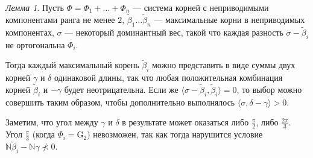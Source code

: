 \documentclass[10pt]{article}
\theoremstyle{break}
\theoremstyle{remark}
\newtheorem{lm}{Лемма}
\newcommand{\N}{\mathbb{N}}
\begin{document}
\begin{lm}\label{maxrootsum}
Пусть $\Phi=\Phi_1+\ldots+\Phi_n$ --- система корней с неприводимыми компонентами ранга не менее $2$, $\widetilde\beta_1 \ldots \widetilde\beta_n$ ---  максимальные корни в неприводимых компонентах, $\sigma$ --- некоторый доминантный вес, такой что каждая разность $\sigma-\widetilde\beta_i$ не ортогональна $\Phi_i$.

Тогда каждый максимальный корень $\widetilde\beta_i$ можно представить в виде суммы двух корней $\gamma$ и $\delta$ одинаковой длины, так что любая положительная комбинация корней $\widetilde\beta_i$ и $-\gamma$ будет неотрицательна. Если же $\langle\sigma-\widetilde\beta_i,\widetilde\beta_i\rangle=0$, то выбор можно совершить таким образом, чтобы дополнительно выполнялось $\langle\sigma,\delta-\gamma\rangle>0$.

Заметим, что угол между $\gamma$ и $\delta$ в результате может оказаться либо $\frac{\pi}{2}$, либо $\frac{2\pi}{3}$. Угол $\frac{\pi}{3}$ (когда $\Phi_i = \mathrm{G}_2$) невозможен, так как тогда нарушится условие $\N\widetilde\beta_i-\N\gamma \nprec 0$.
\end{lm}
\end{document}
